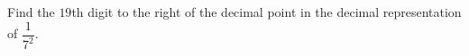 Find the $19$th digit to the right of the decimal point in the decimal representation of $\dfrac{1}{7^2}$.
